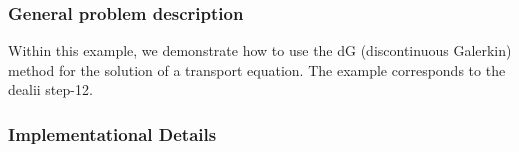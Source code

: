 \subsubsection{General problem description}
Within this example, we demonstrate how to use the
dG (discontinuous Galerkin) method for the solution of 
a transport equation. The example corresponds to 
the dealii step-12.

\subsubsection{Implementational Details}
